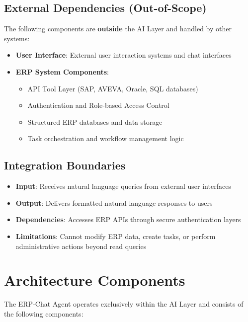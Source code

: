\documentclass[12pt]{report}
\begin{document}
\subsection{External Dependencies (Out-of-Scope)}
The following components are \textbf{outside} the AI Layer and handled by other systems:
\begin{itemize}
  \item \textbf{User Interface}: External user interaction systems and chat interfaces
  \item \textbf{ERP System Components}:
    \begin{itemize}
      \item API Tool Layer (SAP, AVEVA, Oracle, SQL databases)
      \item Authentication and Role-based Access Control
      \item Structured ERP databases and data storage
      \item Task orchestration and workflow management logic
    \end{itemize}
\end{itemize}

\subsection{Integration Boundaries}
\begin{itemize}
  \item \textbf{Input}: Receives natural language queries from external user interfaces
  \item \textbf{Output}: Delivers formatted natural language responses to users
  \item \textbf{Dependencies}: Accesses ERP APIs through secure authentication layers
  \item \textbf{Limitations}: Cannot modify ERP data, create tasks, or perform administrative actions beyond read queries
\end{itemize}

\section{Architecture Components}
The ERP-Chat Agent operates exclusively within the AI Layer and consists of the following components:
\end{document}

